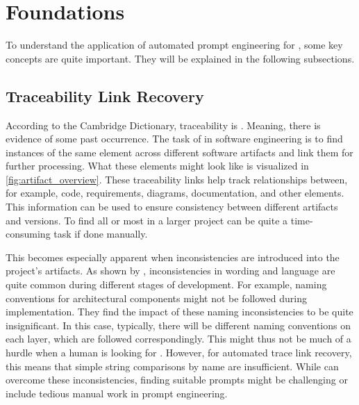 \chapter{Foundations}
\label{ch:foundations}

To understand the application of automated prompt engineering for \TLR, some key concepts are quite important.
They will be explained in the following subsections.


\section{Traceability Link Recovery}
\label{sec:foundations:tlr}
According to the Cambridge Dictionary, traceability is .
Meaning, there is evidence of some past occurrence.
The task of \TLR in software engineering is to find instances of the same element across different software artifacts and link them for further processing.
What these elements might look like is visualized in \autoref{fig:artifact_overview}.
These traceability links help track relationships between, for example, code, requirements, diagrams, documentation, and other elements.
This information can be used to ensure consistency between different artifacts and versions.
To find all or most \TLs in a larger project can be quite a time-consuming task if done manually.

This becomes especially apparent when inconsistencies are introduced into the project's artifacts.
As shown by , inconsistencies  in wording and language are quite common during different stages of development.
For example, naming conventions for architectural components might not be followed during implementation.
They find the impact of these naming inconsistencies to be quite insignificant.
In this case, typically, there will be different naming conventions on each layer, which are followed correspondingly.
This might thus not be much of a hurdle when a human is looking for \TLs.
However, for automated trace link recovery, this means that simple string comparisons by name are insufficient.
While \LLMs can overcome these inconsistencies, finding suitable prompts might be challenging or include tedious manual work in prompt engineering.

\section{\LiSSA}
\label{sec:foundations:lissa}

